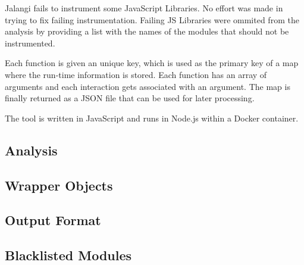 Jalangi fails to instrument some JavaScript Libraries. No effort was made in trying to fix failing instrumentation. Failing JS Libraries were ommited from the analysis by providing a list with the names of the modules that should not be instrumented.

Each function is given an unique key, which is used as the primary key of a map where the run-time information is stored. Each function has an array of arguments and each interaction gets associated with an argument. The map is finally returned as a JSON file that can be used for later processing.

The tool is written in JavaScript and runs in Node.js within a Docker container.



\subsection{Analysis} \label{run-time-analysis}







\subsection{Wrapper Objects}

\subsection{Output Format}

\subsection{Blacklisted Modules}


